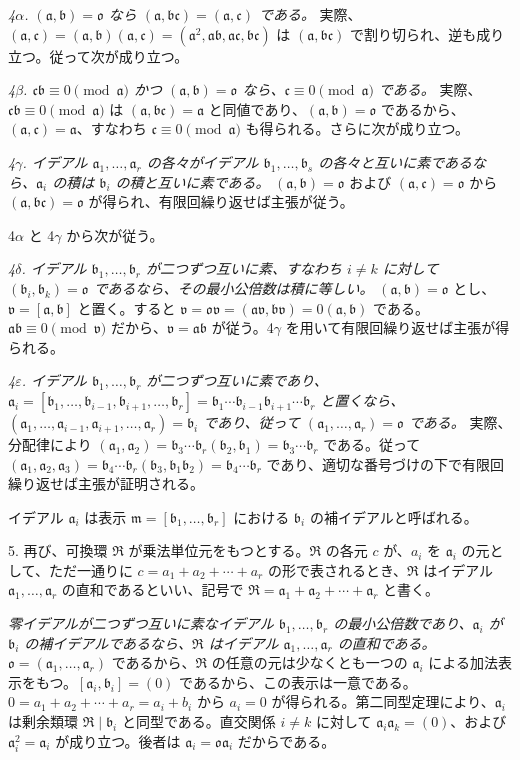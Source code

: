 \documentclass[11pt]{article}
\providecommand{\mR}{\mathfrak{R}}
\providecommand{\ma}{\mathfrak{a}}
\providecommand{\mb}{\mathfrak{b}}
\providecommand{\mc}{\mathfrak{c}}
\providecommand{\mm}{\mathfrak{m}}
\providecommand{\mo}{\mathfrak{o}}
\providecommand{\mv}{\mathfrak{v}}
\begin{document}
\emph{4$\alpha$. $(\ma,\mb)=\mo$ なら $(\ma,\mb\mc)=(\ma,\mc)$ である。} 実際、$(\ma,\mc)=(\ma,\mb)(\ma,\mc)=(\ma^2,\ma\mb,\ma\mc,\mb\mc)$ は $(\ma,\mb\mc)$ で割り切られ、逆も成り立つ。従って次が成り立つ。

\emph{4$\beta$. $\mc\mb\equiv0\pmod{\ma}$ かつ $(\ma,\mb)=\mo$ なら、$\mc\equiv0\pmod{\ma}$ である。} 実際、$\mc\mb\equiv0\pmod{\ma}$ は $(\ma,\mb\mc)=\ma$ と同値であり、$(\ma,\mb)=\mo$ であるから、$(\ma,\mc)=\ma$、すなわち $\mc\equiv0\pmod{\ma}$ も得られる。さらに次が成り立つ。

\emph{4$\gamma$. イデアル $\ma_1,\ldots,\ma_r$ の各々がイデアル $\mb_1,\ldots,\mb_s$ の各々と互いに素であるなら、$\ma_i$ の積は $\mb_i$ の積と互いに素である。} $(\ma,\mb)=\mo$ および $(\ma,\mc)=\mo$ から $(\ma,\mb\mc)=\mo$ が得られ、有限回繰り返せば主張が従う。

4$\alpha$ と 4$\gamma$ から次が従う。

\emph{4$\delta$. イデアル $\mb_1,\ldots,\mb_r$ が二つずつ互いに素、すなわち $i\ne k$ に対して $(\mb_i,\mb_k)=\mo$ であるなら、その最小公倍数は積に等しい。} $(\ma,\mb)=\mo$ とし、$\mv=[\ma,\mb]$ と置く。すると $\mv=\mo\mv=(\ma\mv,\mb\mv)=0(\ma,\mb)$ である。$\ma\mb\equiv0\pmod{\mv}$ だから、$\mv=\ma\mb$ が従う。4$\gamma$ を用いて有限回繰り返せば主張が得られる。

\emph{4$\varepsilon$. イデアル $\mb_1,\ldots,\mb_r$ が二つずつ互いに素であり、$\ma_i=[\mb_1,\ldots,\mb_{i-1},\mb_{i+1},\ldots,\mb_r]=\mb_1\cdots\mb_{i-1}\mb_{i+1}\cdots\mb_r$ と置くなら、$(\ma_1,\ldots,\ma_{i-1},\ma_{i+1},\ldots,\ma_r)=\mb_i$ であり、従って $(\ma_1,\ldots,\ma_r)=\mo$ である。} 実際、分配律により $(\ma_1,\ma_2)=\mb_3\cdots\mb_r(\mb_2,\mb_1)=\mb_3\cdots\mb_r$ である。従って $(\ma_1,\ma_2,\ma_3)=\mb_4\cdots\mb_r(\mb_3,\mb_1\mb_2)=\mb_4\cdots\mb_r$ であり、適切な番号づけの下で有限回繰り返せば主張が証明される。

イデアル $\ma_i$ は表示 $\mm=[\mb_1,\ldots,\mb_r]$ における $\mb_i$ の補イデアルと呼ばれる。

5. 再び、可換環 $\mR$ が乗法単位元をもつとする。$\mR$ の各元 $c$ が、$a_i$ を $\ma_i$ の元として、ただ一通りに $c=a_1+a_2+\cdots+a_r$ の形で表されるとき、$\mR$ はイデアル $\ma_1,\ldots,\ma_r$ の直和であるといい、記号で $\mR=\ma_1+\ma_2+\cdots+\ma_r$ と書く。

\emph{零イデアルが二つずつ互いに素なイデアル $\mb_1,\ldots,\mb_r$ の最小公倍数であり、$\ma_i$ が $\mb_i$ の補イデアルであるなら、$\mR$ はイデアル $\ma_1,\ldots,\ma_r$ の直和である。} $\mo=(\ma_1,\ldots,\ma_r)$ であるから、$\mR$ の任意の元は少なくとも一つの $\ma_i$ による加法表示をもつ。$[\ma_i,\mb_i]=(0)$ であるから、この表示は一意である。$0=a_1+a_2+\cdots+a_r=a_i+b_i$ から $a_i=0$ が得られる。第二同型定理により、$\ma_i$ は剰余類環 $\mR\mid\mb_i$ と同型である。直交関係 $i\ne k$ に対して $\ma_i\ma_k=(0)$、および $\ma_i^2=\ma_i$ が成り立つ。後者は $\ma_i=\mo\ma_i$ だからである。
\end{document}
